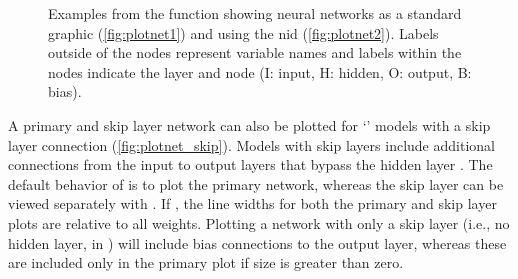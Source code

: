 \documentclass[article]{jss}
\begin{document}
\begin{figure}[t!]
\caption{Examples from the  function showing neural networks as a standard graphic (\ref{fig:plotnet1}) and using the \acl{nid} (\ref{fig:plotnet2}).  Labels outside of the nodes represent variable names and labels within the nodes indicate the layer and node (I: input, H: hidden, O: output, B: bias).}
\label{fig:plotnet}
\end{figure}

A primary and skip layer network can also be plotted for `'
models with a skip layer connection (\cref{fig:plotnet_skip}). Models
with skip layers include additional connections from the input to
output layers that bypass the hidden layer \citep{Ripley96}.  The
default behavior of  is to plot the primary network,
whereas the skip layer can be viewed separately with . If , the line widths for both the primary
and skip layer plots are relative to all weights. Plotting a network
with only a skip layer (i.e., no hidden layer,  in
) will include bias connections to the output layer,
whereas these are included only in the primary plot if size is greater
than zero.
\end{document}
